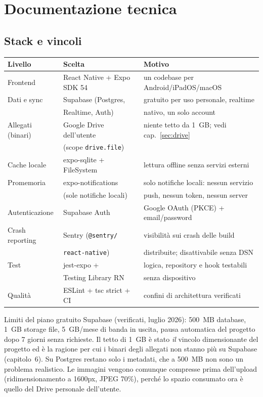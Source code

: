 \documentclass[11pt,a4paper]{report}
\begin{document}
\part{Documentazione tecnica}

\chapter{Stack e vincoli}

\begin{center}
\begin{tabular}{@{}lll@{}}
\toprule
\textbf{Livello} & \textbf{Scelta} & \textbf{Motivo} \\
\midrule
Frontend & React Native + Expo SDK 54 & un codebase per Android/iPadOS/macOS \\
Dati e sync & Supabase (Postgres, & gratuito per uso personale, realtime \\
            & Realtime, Auth) & nativo, un solo account \\
Allegati (binari) & Google Drive dell'utente & niente tetto da 1~GB; vedi cap.~\ref{sec:drive} \\
                  & (scope \texttt{drive.file}) & \\
Cache locale & expo-sqlite + FileSystem & lettura offline senza servizi esterni \\
Promemoria & expo-notifications & solo notifiche locali: nessun servizio \\
           & (sole notifiche locali) & push, nessun token, nessun server \\
Autenticazione & Supabase Auth & Google OAuth (PKCE) + email/password \\
Crash reporting & Sentry (\texttt{@sentry/} & visibilit\`a sui crash delle build \\
                & \texttt{react-native}) & distribuite; disattivabile senza DSN \\
Test & jest-expo + & logica, repository e hook testabili \\
     & Testing Library RN & senza dispositivo \\
Qualit\`a & ESLint + tsc strict + CI & confini di architettura verificati \\
\bottomrule
\end{tabular}
\end{center}

Limiti del piano gratuito Supabase (verificati, luglio 2026): 500~MB database,
1~GB storage file, 5~GB/mese di banda in uscita, pausa automatica del progetto
dopo 7 giorni senza richieste. Il tetto di 1~GB \`e stato \emph{il} vincolo
dimensionante del progetto ed \`e la ragione per cui i binari degli allegati
non stanno pi\`u su Supabase (capitolo~6). Su Postgres restano solo i
metadati, che a 500~MB non sono un problema realistico. Le immagini vengono
comunque compresse prima dell'upload (ridimensionamento a 1600px, JPEG 70\%),
perch\'e lo spazio consumato ora \`e quello del Drive personale dell'utente.
\end{document}
